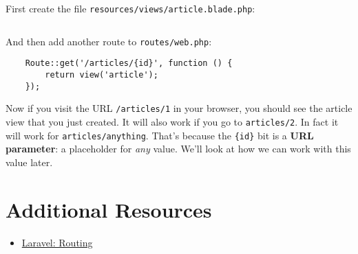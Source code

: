First create the file \texttt{resources/views/article.blade.php}:

\inputminted{html}{08-routing/figures/02-article.blade.php}

And then add another route to \texttt{routes/web.php}:

\begin{verbatim}
    Route::get('/articles/{id}', function () {
        return view('article');
    });
\end{verbatim}

Now if you visit the URL \texttt{/articles/1} in your browser, you should see the article view that you just created. It will also work if you go to \texttt{articles/2}. In fact it will work for \texttt{articles/anything}. That's because the \texttt{\{id\}} bit is a \textbf{URL parameter}: a placeholder for \textit{any} value. We'll look at how we can work with this value later.

\section{Additional Resources}

\begin{itemize}[leftmargin=*]
    \item \href{http://laravel.com/docs/master/routing}{Laravel: Routing}
\end{itemize}
